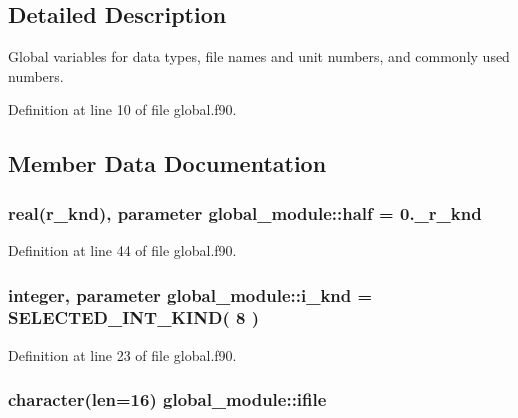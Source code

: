 \subsection{Detailed Description}
Global variables for data types, file names and unit numbers, and commonly used numbers. 

Definition at line 10 of file global.\-f90.



\subsection{Member Data Documentation}
\hypertarget{classglobal__module_aca3045154e42c1413c7e40cff43d609b}{
\subsubsection[{half}]{\setlength{\rightskip}{0pt plus 5cm}real({\bf r\-\_\-knd}), parameter global\-\_\-module\-::half = 0.\-\_\-r\-\_\-knd}}\label{classglobal__module_aca3045154e42c1413c7e40cff43d609b}


Definition at line 44 of file global.\-f90.

\hypertarget{classglobal__module_a01b861666154d8b3e5bd725ae8933438}{
\subsubsection[{i\-\_\-knd}]{\setlength{\rightskip}{0pt plus 5cm}integer, parameter global\-\_\-module\-::i\-\_\-knd = S\-E\-L\-E\-C\-T\-E\-D\-\_\-\-I\-N\-T\-\_\-\-K\-I\-N\-D( 8 )}}\label{classglobal__module_a01b861666154d8b3e5bd725ae8933438}


Definition at line 23 of file global.\-f90.

\hypertarget{classglobal__module_a94b80c776276c5e9e870df62cdc27b1d}{
\subsubsection[{ifile}]{\setlength{\rightskip}{0pt plus 5cm}character(len=16) global\-\_\-module\-::ifile}}\label{classglobal__module_a94b80c776276c5e9e870df62cdc27b1d}


